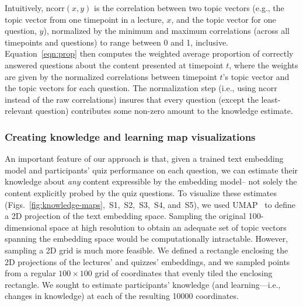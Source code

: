 \documentclass[10pt]{article}
\newcommand{\individualKnowledgeMapsA}{S1}
\newcommand{\individualKnowledgeMapsB}{S2}
\newcommand{\individualKnowledgeMapsC}{S3}
\newcommand{\individualLearningMapsA}{S4}
\newcommand{\individualLearningMapsB}{S5}
\begin{document}
Intuitively, $\mathrm{ncorr}(x, y)$ is the correlation between two topic
vectors (e.g., the topic vector from one timepoint in a lecture, $x$, and the
topic vector for one question, $y$), normalized by the minimum and maximum
correlations (across all timepoints and questions) to range between 0 and 1,
inclusive. Equation~\ref{eqn:prop} then computes the weighted average
proportion of correctly answered questions about the content presented at
timepoint $t$, where the weights are given by the normalized correlations
between timepoint $t$'s topic vector and the topic vectors for each question.
The normalization step (i.e., using $\mathrm{ncorr}$ instead of the raw
correlations) insures that every question (except the least-relevant question)
contributes some non-zero amount to the knowledge estimate.

\subsubsection*{Creating knowledge and learning map visualizations}

An important feature of our approach is that, given a trained text embedding
model and participants' quiz performance on each question, we can estimate
their knowledge about \textit{any} content expressible by the embedding model--
not solely the content explicitly probed by the quiz questions. To visualize
these estimates
(Figs.~\ref{fig:knowledge-maps},~\individualKnowledgeMapsA,~\individualKnowledgeMapsB,~\individualKnowledgeMapsC,~\individualLearningMapsA,
and~\individualLearningMapsB), we used UMAP~\citep{McInEtal18a} to define a 2D
projection of the text embedding space. Sampling the original 100-dimensional
space at high resolution to obtain an adequate set of topic vectors spanning
the embedding space would be computationally intractable. However, sampling a
2D grid is much more feasible. We defined a rectangle enclosing the 2D
projections of the lectures' and quizzes' embeddings, and we sampled points
from a regular $100 \times 100$ grid of coordinates that evenly tiled the
enclosing rectangle. We sought to estimate participants' knowledge (and
learning---i.e., changes in knowledge) at each of the resulting 10000
coordinates.
\end{document}
